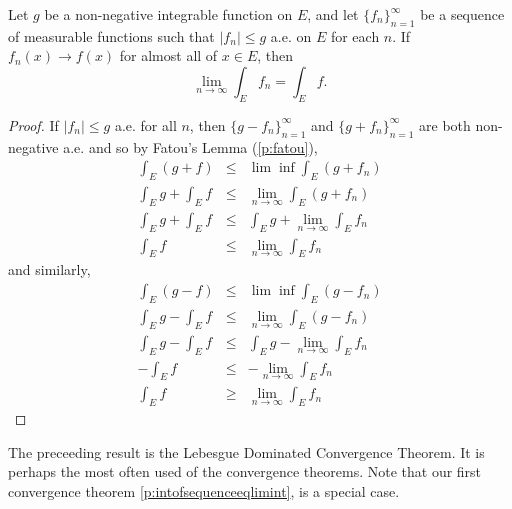 \begin{pblm}\label{p:lebesguedominatedconvergence}%
	Let $g$ be a non-negative integrable function on $E$, and let $\{f_n\}_{n=1}^\infty$ 
	be a sequence of measurable functions such that $|f_n| \le g$ a.e. on $E$ for each 
	$n$. If $f_n(x) \rightarrow f(x)$ for almost all of $x \in E$, then 
	\begin{equation*}
		\lim\limits_{n\to\infty}\int_Ef_n = \int_Ef. 
	\end{equation*}
\begin{proof}
	If $|f_n| \le g$ a.e. for all $n$, then 
	$\{g - f_n\}_{n=1}^\infty$ and $\{g + f_n\}_{n=1}^\infty$ are both non-negative a.e. 
	and so by Fatou's Lemma (\ref{p:fatou}), 
	\begin{equation*}
	\begin{array}{rcl}
		\int_E(g+f) & \le & \lim\inf\int_E(g+f_n) \\ 
		\int_Eg + \int_E f & \le & \lim\limits_{n\to\infty}\int_E(g+f_n)\\
		\int_Eg + \int_Ef & \le & \int_Eg + \lim\limits_{n\to\infty}\int_Ef_n\\
		\int_Ef & \le & \lim\limits_{n\to\infty}\int_Ef_n
	\end{array}
	\end{equation*}
	and similarly, 
	\begin{equation*}
	\begin{array}{rcl}
		\int_E(g-f) & \le & \lim\inf\int_E(g-f_n) \\ 
		\int_Eg - \int_E f & \le & \lim\limits_{n\to\infty}\int_E(g-f_n)\\
		\int_Eg - \int_Ef & \le & \int_Eg - \lim\limits_{n\to\infty}\int_Ef_n\\
		-\int_Ef & \le & -\lim\limits_{n\to\infty}\int_Ef_n\\
		\int_Ef & \ge & \lim\limits_{n\to\infty}\int_Ef_n
	\end{array}
	\end{equation*}
\end{proof}
\end{pblm}

\begin{rmk}%
	The preceeding result is the Lebesgue Dominated Convergence Theorem. It is perhaps the 
	most often used of the convergence theorems. Note that our first convergence theorem 
	\ref{p:intofsequenceeqlimint}, is a special case. 
\end{rmk}

